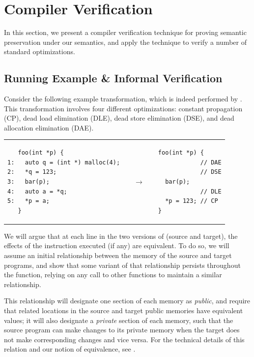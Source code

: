 \section{Compiler Verification}
\label{sec:intptrcast:compiler-verification}

In this section, we present a compiler verification technique for proving semantic preservation
under our semantics, and apply the technique to verify a number of standard optimizations.



\subsection{Running Example \& Informal Verification}
\label{reasoning:running}

Consider the following example transformation, which is indeed performed by .  This
transformation involves four different optimizations: constant propagation (CP), dead load
elimination (DLE), dead store elimination (DSE), and dead allocation elimination (DAE).
\begin{center}
\begin{tabular}{@{}l@{}l@{}l@{}}
\begin{minipage}{0.5\textwidth}
\begin{verbatim}
   foo(int *p) {
1:   auto q = (int *) malloc(4);
2:   *q = 123;
3:   bar(p);
4:   auto a = *q;
5:   *p = a;
   }
\end{verbatim}
\end{minipage}
&
$\quad\rightarrow\quad$
&
\begin{minipage}{0.3\textwidth}
\begin{verbatim}
foo(int *p) {
            // DAE
            // DSE
  bar(p);
            // DLE
  *p = 123; // CP
}
\end{verbatim}
\end{minipage}
\end{tabular}
\end{center}

We will argue that at each line in the two versions of  (source and target), the effects
of the instruction executed (if any) are equivalent. To do so, we will assume an initial
relationship between the memory of the source and target programs, and show that some variant of
that relationship persists throughout the function, relying on any call to other functions to
maintain a similar relationship.

This relationship will designate one section of each memory as \emph{public}, and require that related locations in the source and target public memories have equivalent values; it will also designate a \emph{private} section of each memory, such that the source program can make changes to its private memory when the target does not make corresponding changes and vice versa. For the technical details of this relation and our notion of equivalence, see .

